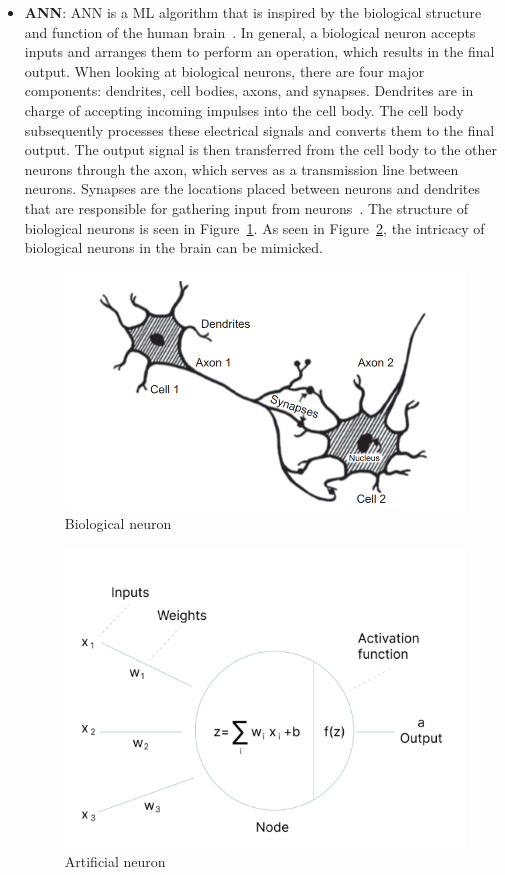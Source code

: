 \begin{itemize}
    \item \textbf{\gls{ANN}}: \gls{ANN} is a \gls{ML} algorithm that is inspired by the biological structure and function of the human brain~\cite{ArtificialDataFlair}. In general, a biological neuron accepts inputs and arranges them to perform an operation, which results in the final output. When looking at biological neurons, there are four major components: dendrites, cell bodies, axons, and synapses. Dendrites are in charge of accepting incoming impulses into the cell body. The cell body subsequently processes these electrical signals and converts them to the final output. The output signal is then transferred from the cell body to the other neurons through the axon, which serves as a transmission line between neurons. Synapses are the locations placed between neurons and dendrites that are responsible for gathering input from neurons~\cite{Imran2019AClassification}. The structure of biological neurons is seen in Figure~\ref{fig:neuron}. As seen in Figure~\ref{fig:an}, the intricacy of biological neurons in the brain can be mimicked.
    
    \begin{figure}[htbp]
        \centering
        \includegraphics[width=0.75\linewidth]{Chapters/Figures/neuron.png}
        \caption{Biological neuron~\cite{Deyoung1990ThinkingResearch}}
        \label{fig:neuron}
    \end{figure}
    
    \begin{figure}[htbp]
        \centering
        \includegraphics[width=0.65\linewidth]{Chapters/Figures/an.png}
        \caption{Artificial neuron~\cite{Baheti12Choose}}
        \label{fig:an}
    \end{figure}
    

\end{itemize}
